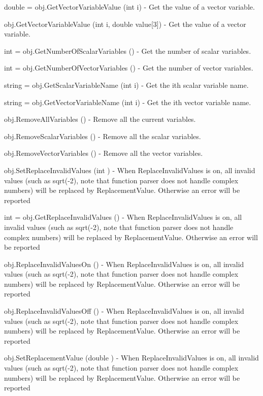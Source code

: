 \begin{DoxyItemize}
\item {\ttfamily double = obj.\-Get\-Vector\-Variable\-Value (int i)} -\/ Get the value of a vector variable.  
\item {\ttfamily obj.\-Get\-Vector\-Variable\-Value (int i, double value\mbox{[}3\mbox{]})} -\/ Get the value of a vector variable.  
\item {\ttfamily int = obj.\-Get\-Number\-Of\-Scalar\-Variables ()} -\/ Get the number of scalar variables.  
\item {\ttfamily int = obj.\-Get\-Number\-Of\-Vector\-Variables ()} -\/ Get the number of vector variables.  
\item {\ttfamily string = obj.\-Get\-Scalar\-Variable\-Name (int i)} -\/ Get the ith scalar variable name.  
\item {\ttfamily string = obj.\-Get\-Vector\-Variable\-Name (int i)} -\/ Get the ith vector variable name.  
\item {\ttfamily obj.\-Remove\-All\-Variables ()} -\/ Remove all the current variables.  
\item {\ttfamily obj.\-Remove\-Scalar\-Variables ()} -\/ Remove all the scalar variables.  
\item {\ttfamily obj.\-Remove\-Vector\-Variables ()} -\/ Remove all the vector variables.  
\item {\ttfamily obj.\-Set\-Replace\-Invalid\-Values (int )} -\/ When Replace\-Invalid\-Values is on, all invalid values (such as sqrt(-\/2), note that function parser does not handle complex numbers) will be replaced by Replacement\-Value. Otherwise an error will be reported  
\item {\ttfamily int = obj.\-Get\-Replace\-Invalid\-Values ()} -\/ When Replace\-Invalid\-Values is on, all invalid values (such as sqrt(-\/2), note that function parser does not handle complex numbers) will be replaced by Replacement\-Value. Otherwise an error will be reported  
\item {\ttfamily obj.\-Replace\-Invalid\-Values\-On ()} -\/ When Replace\-Invalid\-Values is on, all invalid values (such as sqrt(-\/2), note that function parser does not handle complex numbers) will be replaced by Replacement\-Value. Otherwise an error will be reported  
\item {\ttfamily obj.\-Replace\-Invalid\-Values\-Off ()} -\/ When Replace\-Invalid\-Values is on, all invalid values (such as sqrt(-\/2), note that function parser does not handle complex numbers) will be replaced by Replacement\-Value. Otherwise an error will be reported  
\item {\ttfamily obj.\-Set\-Replacement\-Value (double )} -\/ When Replace\-Invalid\-Values is on, all invalid values (such as sqrt(-\/2), note that function parser does not handle complex numbers) will be replaced by Replacement\-Value. Otherwise an error will be reported  

\end{DoxyItemize}
